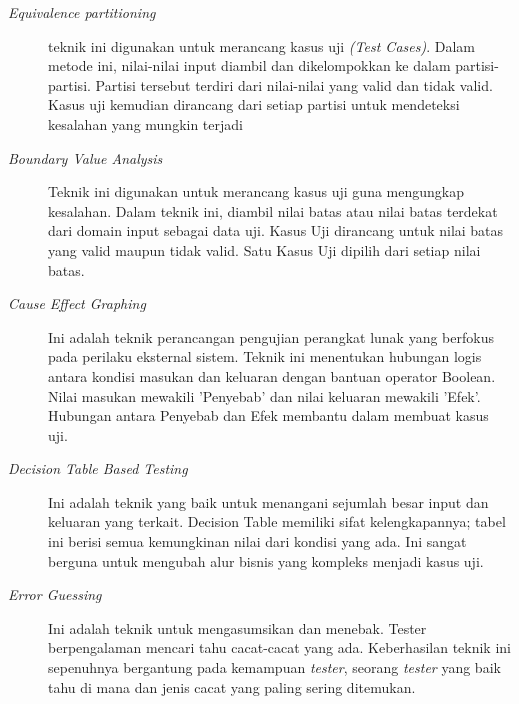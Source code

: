 \begin{description}
	\item[\textit{Equivalence partitioning}]teknik ini digunakan untuk merancang kasus uji \textit{(Test Cases)}. Dalam metode ini, nilai-nilai input diambil dan dikelompokkan ke dalam partisi-partisi. Partisi tersebut terdiri dari nilai-nilai yang valid dan tidak valid. Kasus uji kemudian dirancang dari setiap partisi untuk mendeteksi kesalahan yang mungkin terjadi
	\item[\textit{Boundary Value Analysis}]Teknik ini digunakan untuk merancang kasus uji guna mengungkap kesalahan. Dalam teknik ini, diambil nilai batas atau nilai batas terdekat dari domain input sebagai data uji. Kasus Uji dirancang untuk nilai batas yang valid maupun tidak valid. Satu Kasus Uji dipilih dari setiap nilai batas.
	\item[\textit{Cause Effect Graphing}]Ini adalah teknik perancangan pengujian perangkat lunak yang berfokus pada perilaku eksternal sistem. Teknik ini menentukan hubungan logis antara kondisi masukan dan keluaran dengan bantuan operator Boolean. Nilai masukan mewakili 'Penyebab' dan nilai keluaran mewakili 'Efek'. Hubungan antara Penyebab dan Efek membantu dalam membuat kasus uji.
	\item[\textit{Decision Table Based Testing}]Ini adalah teknik yang baik untuk menangani sejumlah besar input dan keluaran yang terkait. Decision Table memiliki sifat kelengkapannya; tabel ini berisi semua kemungkinan nilai dari kondisi yang ada. Ini sangat berguna untuk mengubah alur bisnis yang kompleks menjadi kasus uji.
	\item[\textit{Error Guessing}]Ini adalah teknik untuk mengasumsikan dan menebak. Tester berpengalaman mencari tahu cacat-cacat yang ada. Keberhasilan teknik ini sepenuhnya bergantung pada kemampuan \textit{tester}, seorang \textit{ tester} yang baik tahu di mana dan jenis cacat yang paling sering ditemukan.
\end{description}

